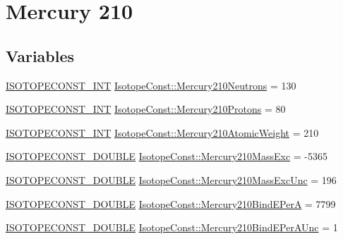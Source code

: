 \hypertarget{group___isotope_const-_mercury-_hg210}{}\section{Mercury 210}
\label{group___isotope_const-_mercury-_hg210}
\subsection*{Variables}
\begin{DoxyCompactItemize}
\item 
\mbox{\hyperlink{group___isotope_const-_macros_ga5f18360b3e99483a35c32d789e62621c}{I\+S\+O\+T\+O\+P\+E\+C\+O\+N\+S\+T\+\_\+\+I\+NT}} \mbox{\hyperlink{group___isotope_const-_mercury-_hg210_ga38b172708fab52cc611464935191daa9}{Isotope\+Const\+::\+Mercury210\+Neutrons}} = 130
\item 
\mbox{\hyperlink{group___isotope_const-_macros_ga5f18360b3e99483a35c32d789e62621c}{I\+S\+O\+T\+O\+P\+E\+C\+O\+N\+S\+T\+\_\+\+I\+NT}} \mbox{\hyperlink{group___isotope_const-_mercury-_hg210_ga5e8e00433d814fffad07dad4ddab5068}{Isotope\+Const\+::\+Mercury210\+Protons}} = 80
\item 
\mbox{\hyperlink{group___isotope_const-_macros_ga5f18360b3e99483a35c32d789e62621c}{I\+S\+O\+T\+O\+P\+E\+C\+O\+N\+S\+T\+\_\+\+I\+NT}} \mbox{\hyperlink{group___isotope_const-_mercury-_hg210_ga6d4969b8687d1baccebd2289374d139d}{Isotope\+Const\+::\+Mercury210\+Atomic\+Weight}} = 210
\item 
\mbox{\hyperlink{group___isotope_const-_macros_ga8f45a7272ce02c0b4c65c44636ed719a}{I\+S\+O\+T\+O\+P\+E\+C\+O\+N\+S\+T\+\_\+\+D\+O\+U\+B\+LE}} \mbox{\hyperlink{group___isotope_const-_mercury-_hg210_ga1c1c9df0b0864394ae30e42abaf3c407}{Isotope\+Const\+::\+Mercury210\+Mass\+Exc}} = -\/5365
\item 
\mbox{\hyperlink{group___isotope_const-_macros_ga8f45a7272ce02c0b4c65c44636ed719a}{I\+S\+O\+T\+O\+P\+E\+C\+O\+N\+S\+T\+\_\+\+D\+O\+U\+B\+LE}} \mbox{\hyperlink{group___isotope_const-_mercury-_hg210_ga0f26923a1eaaf02b7f48024b660eba70}{Isotope\+Const\+::\+Mercury210\+Mass\+Exc\+Unc}} = 196
\item 
\mbox{\hyperlink{group___isotope_const-_macros_ga8f45a7272ce02c0b4c65c44636ed719a}{I\+S\+O\+T\+O\+P\+E\+C\+O\+N\+S\+T\+\_\+\+D\+O\+U\+B\+LE}} \mbox{\hyperlink{group___isotope_const-_mercury-_hg210_ga2414815ac9fea2aac9aae2b63cfb0e60}{Isotope\+Const\+::\+Mercury210\+Bind\+E\+PerA}} = 7799
\item 
\mbox{\hyperlink{group___isotope_const-_macros_ga8f45a7272ce02c0b4c65c44636ed719a}{I\+S\+O\+T\+O\+P\+E\+C\+O\+N\+S\+T\+\_\+\+D\+O\+U\+B\+LE}} \mbox{\hyperlink{group___isotope_const-_mercury-_hg210_ga3dbe9d09d66b20ab915bff90e283c01a}{Isotope\+Const\+::\+Mercury210\+Bind\+E\+Per\+A\+Unc}} = 1

\end{DoxyCompactItemize}
